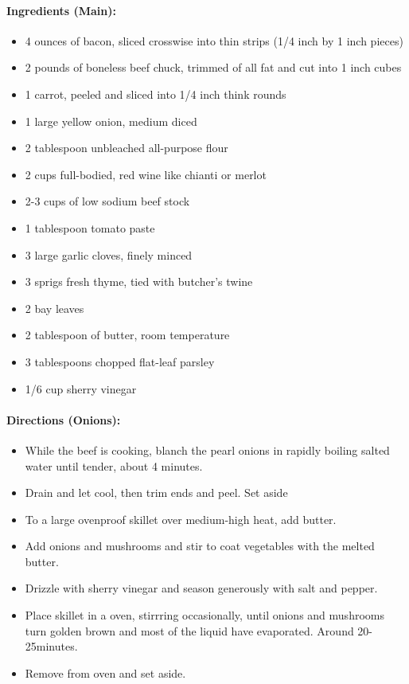 \documentclass{article}
\begin{document}
\paragraph{Ingredients (Main):}
\begin{itemize}
    \item 4 ounces of bacon, sliced crosswise into thin strips (1/4 inch by 1 inch pieces)
    \item 2 pounds of boneless beef chuck, trimmed of all fat and cut into 1 inch cubes
    \item 1 carrot, peeled and sliced into 1/4 inch think rounds
    \item 1 large yellow onion, medium diced
    \item 2 tablespoon unbleached all-purpose flour
    \item 2 cups full-bodied, red wine like chianti or merlot
    \item 2-3 cups of low sodium beef stock
    \item 1 tablespoon tomato paste
    \item 3 large garlic cloves, finely minced
    \item 3 sprigs fresh thyme, tied with butcher's twine
    \item 2 bay leaves
    \item 2 tablespoon of butter, room temperature
    \item 3 tablespoons chopped flat-leaf parsley
    \item 1/6 cup sherry vinegar
\end{itemize}  

\paragraph{Directions (Onions):}
\begin{itemize}
    \item While the beef is cooking, blanch the pearl onions in rapidly boiling salted water until tender, about 4 minutes.
    \item Drain and let cool, then trim ends and peel. Set aside
    \item To a large ovenproof skillet over medium-high heat, add butter.
    \item Add onions and mushrooms and stir to coat vegetables with the melted butter.
    \item Drizzle with sherry vinegar and season generously with salt and pepper.
    \item Place skillet in a oven, stirrring occasionally, until onions and mushrooms turn golden brown and most of the liquid have evaporated. Around 20-25minutes.
    \item Remove from oven and set aside.
\end{itemize}  
\end{document}
